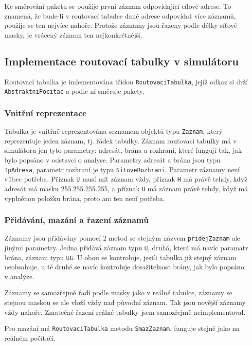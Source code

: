 Ke směrování paketu se použije první záznam odpovídající cílové adrese. To znamená, že bude-li v routovací tabulce dané adrese odpovídat více záznamů, použije se ten nejvíce nahoře. Protože záznamy jsou řazeny podle délky síťové masky, je vrácený záznam ten nejkonkrétnější.


\subsection{Implementace routovací tabulky v simulátoru}

Routovací tabulka je imlementována třídou \verb|RoutovaciTabulka|, jejíž odkaz si drží \verb|AbstraktniPocitac| a podle ní směruje pakety.

\subsubsection{Vnitřní reprezentace}

Tabulka je vnitřně reprezentována seznamem objektů typu \verb|Zaznam|, který reprezentuje jeden záznam, tj. řádek tabulky. Záznam routovací tabulky má v simulátoru jen tyto parametry: adresát, brána a rozhraní, které fungují tak, jak bylo popsáno v odstavci o analyse. Parametry adresát a brána jsou typu \verb|IpAdresa|, parametr rozhraní je typu \verb|SitoveRozhrani|. Parametr záznamy není vůbec potřeba. Příznak \verb|U| musí mít záznam vždy, příznak \verb|H| má právě tehdy, když adresát má masku 255.255.255.255, a příznak \verb|U| má záznam právě tehdy, když má vyplněnou položku brána, proto ani ten není potřeba.

\subsubsection{Přidávání, mazání a řazení záznamů}

Záznamy jsou přidávány pomocí 2 metod se stejným názvem \verb|pridejZaznam| ale jinými parametry. Jedna přidává záznam typu \verb|U|, druhá, která má navíc paramatr brána, záznam typu \verb|UG|. U obou se kontroluje, jestli tabulka již stejný záznam neobsahuje, u té druhé se navíc kontroluje dosažitelnost brány, jak bylo popsáno v analýze.

Záznamy se samozřejmě řadí podle masky jako v reálné tabulce, záznamy se stejnou maskou se ale vloží vždy nad původní záznam. Tak jsou novější záznamy vždy nahoře. Zmatečné řazení reálné tabulky jsem samozřejmě neimplementoval.

Pro mazání má \verb|RoutovaciTabulka| metodu \verb|SmazZaznam|, funguje stejně jako na reálném počítači.


